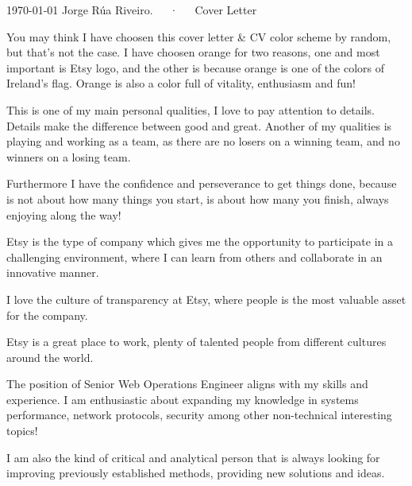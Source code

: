 \documentclass[11pt, a4paper]{awesome-cv}
\begin{document}
\makecvheader

\makecvfooter
  {\today}
  {Jorge Rúa Riveiro.~~~·~~~Cover Letter}
  {}

\makelettertitle

\begin{cvletter}


You may think I have choosen this cover letter \& CV color scheme by random, but that's not the case. I have choosen orange for two reasons, one and most important is Etsy logo, and the other is because orange is one of the colors of Ireland's flag. Orange is also a color full of vitality, enthusiasm and fun!

This is one of my main personal qualities, I love to pay attention to details. Details make the difference between good and great. Another of my qualities is playing and working as a team, as there are no losers on a winning team, and no winners on a losing team.

Furthermore I have the confidence and perseverance to get things done, because is not about how many things you start, is about how many you finish, always enjoying along the way!


Etsy is the type of company which gives me the opportunity to participate in a challenging environment, where I can learn from others and collaborate in an innovative manner.

I love the culture of transparency at Etsy, where people is the most valuable asset for the company.

Etsy is a great place to work, plenty of talented people from different cultures around the world.  


The position of Senior Web Operations Engineer aligns with my skills and experience. I am enthusiastic about expanding my knowledge in systems performance, network protocols, security among other non-technical interesting topics!

I am also the kind of critical and analytical person that is always looking for improving previously established methods, providing new solutions and ideas.
    
\end{cvletter}

\makeletterclosing
\end{document}

